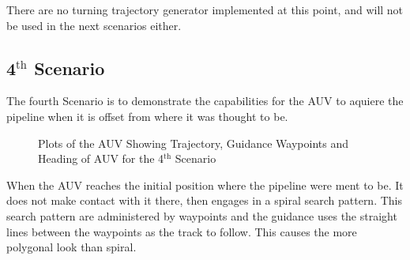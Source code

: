 		There are no turning trajectory generator implemented at this point, and will not be used in
		the next scenarios either.
		
	
	
	\subsection{4$^{\mathrm{th}}$ Scenario}
		The fourth Scenario is to demonstrate the capabilities for the AUV to aquiere the pipeline
		when it is offset from where it was thought to be. 
		
		\begin{figure}[htbp]
			\centering
			\caption{Plots of the AUV Showing Trajectory, Guidance Waypoints and Heading of AUV
			for the 4$^{\mathrm{th}}$ Scenario}
			\label{fig:ch3_4th_NE_plots}
		\end{figure}
		When the AUV reaches the initial position where the pipeline were ment to be. It does not make
		contact with it there, then engages in a spiral search pattern. This search pattern are
		administered by waypoints and the guidance uses the straight lines between the waypoints as
		the track to follow. This causes the more polygonal look than spiral. 

